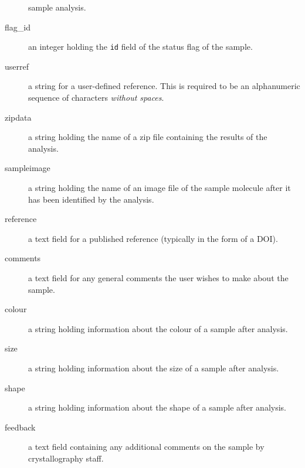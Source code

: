 \documentclass[12pt,twoside]{article}
\begin{document}
\begin{description}
sample analysis.
\item[flag\_id]
an integer holding the \verb=id= field of the status flag of the sample.
\item[userref]
a string for a user-defined reference. This is required to be an
alphanumeric sequence of characters \emph{without spaces}.
\item[zipdata]
a string holding the name of a zip file containing the results of the analysis.
\item[sampleimage]
a string holding the name of an image file of the sample molecule after it
has been identified by the analysis.
\item[reference]
a text field for a published reference (typically in the form of a DOI).
\item[comments]
a text field for any general comments the user wishes to make about the sample.
\item[colour]
a string holding information about the colour of a sample after analysis.
\item[size]
a string holding information about the size of a sample after analysis.
\item[shape]
a string holding information about the shape of a sample after analysis.
\item[feedback]
a text field containing any additional comments on the sample by
crystallography staff.
\end{description}
\end{document}
